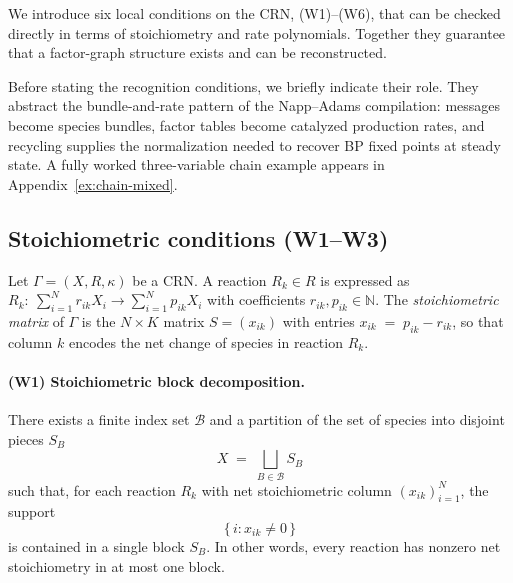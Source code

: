 \documentclass{article}
\theoremstyle{plain}
\theoremstyle{definition}
\theoremstyle{remark}
\newcommand{\<}{\langle}
\renewcommand{\>}{\rangle}
\begin{document}

We introduce six local conditions on the CRN, (W1)--(W6), that can be checked
directly in terms of stoichiometry and rate polynomials. Together they guarantee
that a factor-graph structure exists and can be reconstructed. 

Before stating the recognition conditions, we briefly indicate their role. 
They abstract the bundle-and-rate pattern of the Napp--Adams compilation: 
messages become species bundles, factor tables become catalyzed production 
rates, and recycling supplies the normalization needed to recover BP fixed 
points at steady state. A fully worked three-variable chain example appears 
in Appendix~\ref{ex:chain-mixed}.

\subsection{Stoichiometric conditions (W1--W3)}

Let $\Gamma = (X,R, \kappa)$ be a CRN. A reaction $R_k \in R$ is expressed as $R_k:\ \sum_{i=1}^N r_{ik} X_i \longrightarrow \sum_{i=1}^N p_{ik} X_i$ with coefficients $r_{ik},p_{ik}\in\mathbb N$. The \emph{stoichiometric matrix} of $\Gamma$ is the $N\times K$ matrix
$S=(x_{ik})$ with entries $x_{ik} \;=\; p_{ik}-r_{ik}$,
so that column $k$ encodes the net change of species in reaction $R_k$.

\paragraph*{(W1) Stoichiometric block decomposition.}
There exists a finite index set $\mathcal B$ and a partition of the set of species into disjoint pieces $S_B$
\[
  X \;=\; \bigsqcup_{B\in\mathcal B} S_B
\]
such that, for each reaction $R_k$ with net stoichiometric column
$(x_{ik})_{i=1}^N$, the support
\[
  \{\,i : x_{ik} \neq 0\,\}
\]
is contained in a single block $S_B$. In other words, every reaction has
nonzero net stoichiometry in at most one block.
\end{document}
